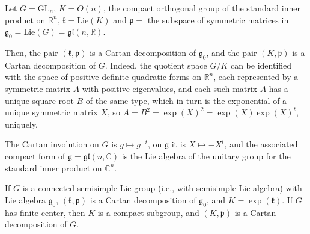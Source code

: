 \begin{example}
 \label{example-Cartan-decomposition-GL}
Let $G=\text{GL}_n$, $K = O(n)$, the compact orthogonal group of the standard inner product on $\mathbb R^n$, $\mathfrak k = \text{Lie}(K)$ and $\mathfrak p=$ the subspace of symmetric matrices in $\mathfrak g_0 = \text{Lie}(G) = \mathfrak{gl}(n, \mathbb R)$. 

Then, the pair $(\mathfrak k, \mathfrak p)$ is a Cartan decomposition of $\mathfrak g_0$, and the pair $(K,\mathfrak p)$ is a Cartan decomposition of $G$. Indeed, the quotient space $G/K$ can be identified with the space of positive definite quadratic forms on $\mathbb R^n$, each represented by a symmetric matrix $A$ with positive eigenvalues, and each such matrix $A$ has a unique square root $B$ of the same type, which in turn is the exponential of a unique symmetric matrix $X$, so $A = B^2 = \exp(X)^2 = \exp(X) \exp(X)^t$, uniquely. 


The Cartan involution on $G$ is $g\mapsto g^{-t}$, on $\mathfrak g$ it is $X\mapsto - X^t$, and the associated compact form of $\mathfrak g = \mathfrak{gl}(n, \mathbb C)$ is the Lie algebra of the unitary group for the standard inner product on $\mathbb C^n$.
\end{example}



\begin{proposition}
 \label{proposition-Cartan-decomposition}
If $G$ is a connected semisimple Lie group (i.e., with semisimple Lie algebra) with Lie algebra $\mathfrak g_0$, $(\mathfrak k,\mathfrak p)$ is a Cartan decomposition of $\mathfrak g_0$, and $K = \exp(\mathfrak k)$. If $G$ has finite center, then $K$ is a compact subgroup, and $(K, \mathfrak p)$ is a Cartan decomposition of $G$.
\end{proposition}

